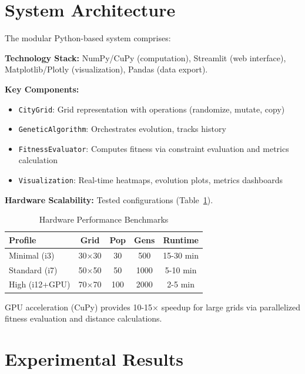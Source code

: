 \documentclass[conference]{IEEEtran}
\begin{document}
\section{System Architecture}

The modular Python-based system comprises:

\textbf{Technology Stack:} NumPy/CuPy (computation), Streamlit (web interface), Matplotlib/Plotly (visualization), Pandas (data export).

\textbf{Key Components:}
\begin{itemize}
    \item \texttt{CityGrid}: Grid representation with operations (randomize, mutate, copy)
    \item \texttt{GeneticAlgorithm}: Orchestrates evolution, tracks history
    \item \texttt{FitnessEvaluator}: Computes fitness via constraint evaluation and metrics calculation
    \item \texttt{Visualization}: Real-time heatmaps, evolution plots, metrics dashboards
\end{itemize}

\textbf{Hardware Scalability:} Tested configurations (Table~\ref{tab:hardware}).

\begin{table}[htbp]
\caption{Hardware Performance Benchmarks}
\begin{center}
\begin{tabular}{lcccc}
\toprule
\textbf{Profile} & \textbf{Grid} & \textbf{Pop} & \textbf{Gens} & \textbf{Runtime} \\
\midrule
Minimal (i3) & 30$\times$30 & 30 & 500 & 15-30 min \\
Standard (i7) & 50$\times$50 & 50 & 1000 & 5-10 min \\
High (i12+GPU) & 70$\times$70 & 100 & 2000 & 2-5 min \\
\bottomrule
\end{tabular}
\label{tab:hardware}
\end{center}
\end{table}

GPU acceleration (CuPy) provides 10-15$\times$ speedup for large grids via parallelized fitness evaluation and distance calculations.

\section{Experimental Results}
\end{document}
